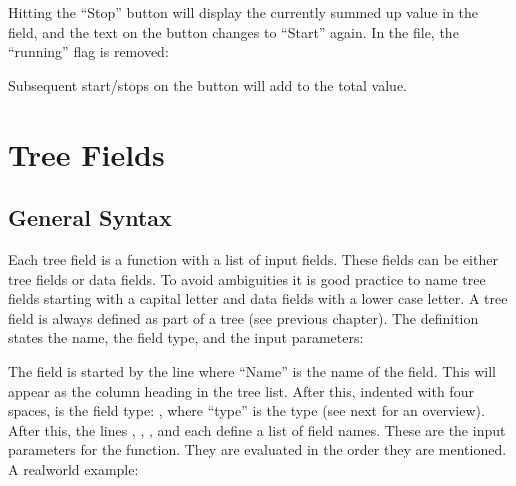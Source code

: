 \documentclass[letterpaper,10pt,english]{sphinxmanual}
\begin{document}
\sphinxAtStartPar
Hitting the “Stop” button will display the currently summed up value in the field, and the text on the button changes to “Start” again. In the file, the “running” flag is removed: 

\sphinxAtStartPar
Subsequent start/stops on the button will add to the total value.

\sphinxstepscope


\chapter{Tree Fields}
\label{\detokenize{tree-fields:tree-fields}}\label{\detokenize{tree-fields::doc}}

\section{General Syntax}
\label{\detokenize{tree-fields:general-syntax}}
\sphinxAtStartPar
Each tree field is a function with a list of input fields. These fields can be either tree fields or data fields. To avoid ambiguities it is good practice to name tree fields starting with a capital letter and data fields with a lower case letter. A tree field is always defined as part of a tree (see previous chapter). The definition states the name, the field type, and the input parameters:

\begin{sphinxVerbatim}[commandchars=\\\{\}]
 
     
     \PYG{p}{[}\PYG{p}{]}
     \PYG{p}{[}\PYG{p}{]}
     \PYG{p}{[}\PYG{p}{]}
     \PYG{p}{[}\PYG{p}{]}
\end{sphinxVerbatim}

\sphinxAtStartPar
The field is started by the line  where “Name” is the name of the field. This will appear as the column heading in the tree list.
After this, indented with four spaces, is the field type: , where “type” is the type (see next for an overview).
After this, the lines , , , and  each define a list of field names. These are the input parameters for the function. They are evaluated in the order they are mentioned. A real\sphinxhyphen{}world example:
\end{document}
